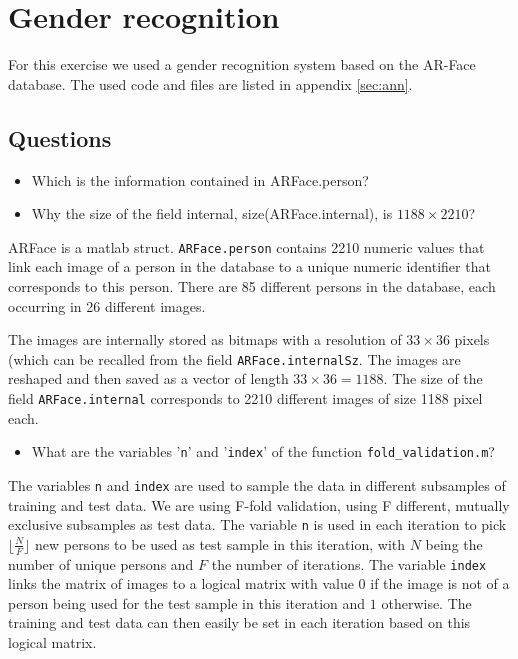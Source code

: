 \section{Gender recognition}

For this exercise we used a gender recognition system based on the AR-Face database. The used code and files are listed in appendix \ref{sec:ann}.

\subsection{Questions}

\question

\begin{itemize}
	\item Which is the information contained in ARFace.person?
	\item Why the size of the field internal, size(ARFace.internal), is $ 1188 \times 2210 $?
\end{itemize}

ARFace is a matlab struct. \texttt{ARFace.person} contains 2210 numeric values that link each image of a person in the database to a unique numeric identifier that corresponds to this person. There are 85 different persons in the database, each occurring in 26 different images. 

The images are internally stored as bitmaps with a resolution of $33 \times 36$ pixels (which can be recalled from the field \texttt{ARFace.internalSz}. The images are reshaped and then saved as a vector of length $33 \times 36 = 1188 $. The size of the field \texttt{ARFace.internal} corresponds to 2210 different images of size 1188 pixel each. \newline


\question

\begin{itemize}
	\item What are the variables '\texttt{n}' and '\texttt{index}' of the function \texttt{fold\_validation.m}?
\end{itemize} 

The variables \texttt{n} and \texttt{index} are used to sample the data in different subsamples of training and test data. We are using F-fold validation, using F different, mutually exclusive subsamples as test data. The variable \texttt{n} is used in each iteration to pick $ \lfloor\frac{N}{F}\rfloor $ new persons to be used as test sample in this iteration, with $N$ being the number of unique persons and $F$ the number of iterations. The variable \texttt{index} links the matrix of images to a logical matrix with value $ 0 $ if the image is not of a person being used for the test sample in this iteration and $ 1 $ otherwise. The training and test data can then easily be set in each iteration based on this logical matrix. 

